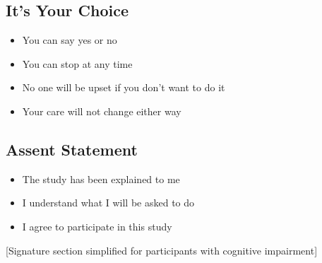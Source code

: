 \subsection{It's Your Choice}
\begin{itemize}
    \item You can say yes or no
    \item You can stop at any time
    \item No one will be upset if you don't want to do it
    \item Your care will not change either way
\end{itemize}

\subsection{Assent Statement}
\begin{itemize}
    \item The study has been explained to me
    \item I understand what I will be asked to do
    \item I agree to participate in this study
\end{itemize}

\vspace{1cm}
[Signature section simplified for participants with cognitive impairment]